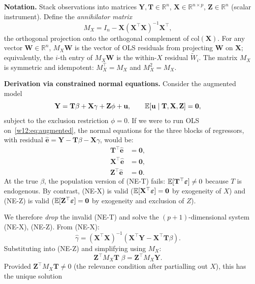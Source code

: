 \documentclass[master.tex]{subfiles}
\begin{document}
\medskip\noindent\textbf{Notation.}
Stack observations into matrices $\mathbf{Y}, \mathbf{T}
\in \mathbb{R}^n$, $\mathbf{X} \in \mathbb{R}^{n \times p}$,
$\mathbf{Z} \in \mathbb{R}^n$ (scalar instrument).  Define the
\emph{annihilator matrix}
\begin{equation}
  M_X = I_n - \mathbf{X}(\mathbf{X}^\top\mathbf{X})^{-1}\mathbf{X}^\top,
  \label{w12:eq:mx}
\end{equation}
the orthogonal projection onto the orthogonal complement of
$\mathrm{col}(\mathbf{X})$.  For any vector $\mathbf{W} \in
\mathbb{R}^n$, $M_X\mathbf{W}$ is the vector of OLS residuals from
projecting $\mathbf{W}$ on $\mathbf{X}$; equivalently, the $i$-th
entry of $M_X\mathbf{W}$ is the within-$X$ residual $\tilde{W}_i$.
The matrix $M_X$ is symmetric and idempotent: $M_X^\top = M_X$ and
$M_X^2 = M_X$.

\medskip\noindent\textbf{Derivation via constrained normal equations.}
Consider the augmented model
\begin{equation}
  \mathbf{Y}
  = \mathbf{T}\beta + \mathbf{X}\gamma + \mathbf{Z}\phi + \mathbf{u},
  \qquad \mathbb{E}[\mathbf{u} \mid \mathbf{T}, \mathbf{X}, \mathbf{Z}]
  = \mathbf{0},
  \label{w12:eq:augmented}
\end{equation}
subject to the exclusion restriction $\phi = 0$.  If we were to run
OLS on~\eqref{w12:eq:augmented}, the normal equations for the three
blocks of regressors, with residual $\hat{\mathbf{e}} = \mathbf{Y} -
\mathbf{T}\beta - \mathbf{X}\gamma$, would be:
\begin{align}
  \mathbf{T}^\top \hat{\mathbf{e}} &= \mathbf{0}, \tag{NE-T}\\
  \mathbf{X}^\top \hat{\mathbf{e}} &= \mathbf{0}, \tag{NE-X}\\
  \mathbf{Z}^\top \hat{\mathbf{e}} &= \mathbf{0}. \tag{NE-Z}
\end{align}
At the true $\beta$, the population version of (NE-T) fails:
$\mathbb{E}[\mathbf{T}^\top\boldsymbol\varepsilon] \neq 0$ because $T$ is
endogenous.  By contrast, (NE-X) is valid ($\mathbb{E}[\mathbf{X}^\top
\boldsymbol\varepsilon] = \mathbf{0}$ by exogeneity of $X$) and
(NE-Z) is valid ($\mathbb{E}[\mathbf{Z}^\top\boldsymbol\varepsilon] =
\mathbf{0}$ by exogeneity and exclusion of $Z$).

We therefore \emph{drop} the invalid (NE-T) and solve the
$(p+1)$-dimensional system (NE-X), (NE-Z).  From (NE-X):
\[
  \hat\gamma
  = (\mathbf{X}^\top\mathbf{X})^{-1}
    (\mathbf{X}^\top\mathbf{Y} - \mathbf{X}^\top\mathbf{T}\beta).
\]
Substituting into (NE-Z) and simplifying using $M_X$:
\[
  \mathbf{Z}^\top M_X \mathbf{T}\;\beta
  = \mathbf{Z}^\top M_X \mathbf{Y}.
\]
Provided $\mathbf{Z}^\top M_X \mathbf{T} \neq 0$ (the relevance
condition after partialling out $X$), this has the unique solution
\end{document}
